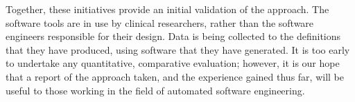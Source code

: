 Together, these initiatives provide an initial validation of the
approach.  The software tools are in use by clinical researchers,
rather than the software engineers responsible for their design.  Data
is being collected to the definitions that they have produced, using
software that they have generated.  It is too early to undertake any
quantitative, comparative evaluation; however, it is our hope that a
report of the approach taken, and the experience gained thus far, will
be useful to those working in the field of automated software
engineering.
